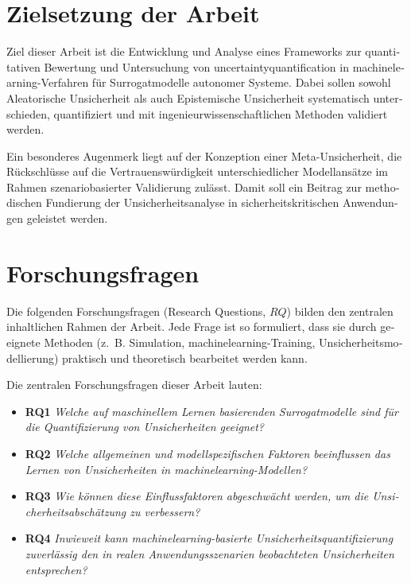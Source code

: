 \begin{otherlanguage}{ngerman}
\section{Zielsetzung der Arbeit}

Ziel dieser Arbeit ist die Entwicklung und Analyse eines Frameworks zur quantitativen Bewertung und Untersuchung von \gls{uncertaintyquantification} in \gls{machinelearning}-Verfahren für Surrogatmodelle autonomer Systeme. Dabei sollen sowohl \gls{Aleatorische Unsicherheit} als auch \gls{Epistemische Unsicherheit} systematisch unterschieden, quantifiziert und mit ingenieurwissenschaftlichen Methoden validiert werden.

Ein besonderes Augenmerk liegt auf der Konzeption einer Meta-Unsicherheit, die Rückschlüsse auf die Vertrauenswürdigkeit unterschiedlicher Modellansätze im Rahmen szenariobasierter Validierung zulässt. Damit soll ein Beitrag zur methodischen Fundierung der Unsicherheitsanalyse in sicherheitskritischen Anwendungen geleistet werden.

\section{Forschungsfragen}

Die folgenden Forschungsfragen (Research Questions, $RQ$) bilden den zentralen inhaltlichen Rahmen der Arbeit. Jede Frage ist so formuliert, dass sie durch geeignete Methoden (z.~B. Simulation, \gls{machinelearning}-Training, Unsicherheitsmodellierung) praktisch und theoretisch bearbeitet werden kann. 

Die zentralen Forschungsfragen dieser Arbeit lauten:

\begin{itemize}
  \item \textbf{RQ1} \textit{Welche auf maschinellem Lernen basierenden Surrogatmodelle sind für die Quantifizierung von Unsicherheiten geeignet?}
  \item \textbf{RQ2} \textit{Welche allgemeinen und modellspezifischen Faktoren beeinflussen das Lernen von Unsicherheiten in \gls{machinelearning}-Modellen?}
  \item \textbf{RQ3} \textit{Wie können diese Einflussfaktoren abgeschwächt werden, um die Unsicherheitsabschätzung zu verbessern?}
  \item \textbf{RQ4} \textit{Inwieweit kann \gls{machinelearning}-basierte Unsicherheitsquantifizierung zuverlässig den in realen Anwendungsszenarien beobachteten Unsicherheiten entsprechen?}
\end{itemize}


\end{otherlanguage}
